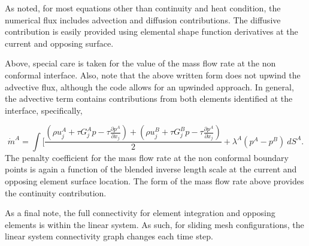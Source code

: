 As noted, for most equations other than continuity and heat condition, the numerical flux includes advection and diffusion contributions. The diffusive contribution is easily provided using elemental shape function derivatives at the current and opposing surface. 

Above, special care is taken for the value of the mass flow rate at the non conformal interface. Also,
note that the above written form does not upwind the advective flux, although the code allows for an upwinded approach. In general, the advective term contains contributions from both elements identified at the interface, specifically,

\begin{equation} 
        \dot {m}^A = \int [\frac{(\rho u_j^A + \tau G_j^A p -\tau \frac{\partial p^A}{\partial x_j}) 
        				       + (\rho u_j^B+ \tau G_j^B p -\tau \frac{\partial p^A}{\partial x_j})}{2}
				       + \lambda^A ( p^A - p^B)\ dS^A.
\label{mdotA}
\end{equation}
The penalty coefficient for the mass flow rate at the non conformal boundary points is again a function of the blended inverse length scale at the current and opposing element surface location. The form of the mass flow rate above provides the continuity contribution.

As a final note, the full connectivity for element integration and opposing elements is within the linear system. As such, for sliding mesh configurations, the linear system connectivity graph changes each time step.











